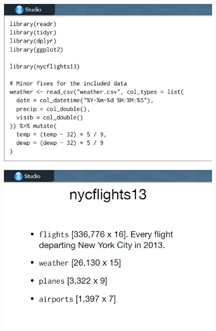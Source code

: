 \documentclass{beamer}
\begin{document}
\begin{frame}
	\begin{figure}
		\centering
		\includegraphics[width=1.05\linewidth]{images/CG-dplyr4}
	\end{figure}
\end{frame}
\begin{frame}
	\begin{figure}
		\centering
		\includegraphics[width=1.05\linewidth]{images/CG-dplyr5}
	\end{figure}
\end{frame}
\end{document}

